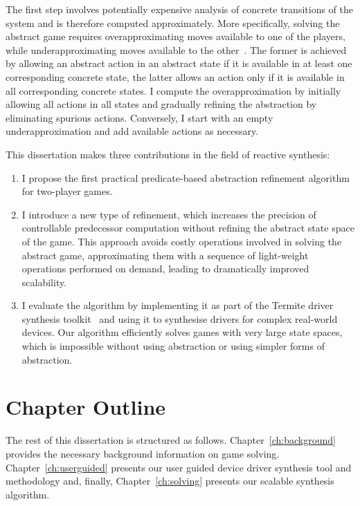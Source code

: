 The first step involves potentially expensive analysis of concrete transitions of the system and is therefore computed approximately.  More specifically, solving the abstract game requires overapproximating moves available to one of the players, while underapproximating moves available to the other~\cite{Henzinger_JM_03}.  The former is achieved by allowing an abstract action in an abstract state if it is available in at least one corresponding concrete state, the latter allows an action only if it is available in all corresponding concrete states.  I compute the overapproximation by initially allowing all actions in all states and gradually refining the abstraction by eliminating spurious actions.  Conversely, I start with an empty underapproximation and add available actions as necessary.

This dissertation makes three contributions in the field of reactive synthesis:
\begin{enumerate}
    \item I propose the first practical predicate-based abstraction refinement algorithm for two-player games.

    \item I introduce a new type of refinement, which increases the precision of controllable predecessor computation without refining the abstract state space of the game.  This approach avoids costly operations involved in solving the abstract game, approximating them with a sequence of light-weight operations performed on demand, leading to dramatically improved scalability.

    \item I evaluate the algorithm by implementing it as part of the Termite driver synthesis toolkit~\cite{Ryzhyk_WKLRSV_14} and using it to synthesise drivers for complex real-world devices.  Our algorithm efficiently solves games with very large state spaces, which is impossible without using abstraction or using simpler forms of abstraction.
\end{enumerate}

\section{Chapter Outline}

The rest of this dissertation is structured as follows. Chapter~\ref{ch:background} provides the necessary background information on game solving. Chapter~\ref{ch:userguided} presents our user guided device driver synthesis tool and methodology and, finally, Chapter~\ref{ch:solving} presents our scalable synthesis algorithm.
